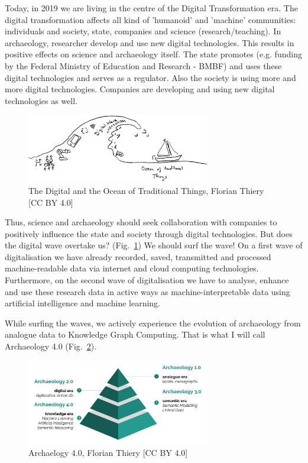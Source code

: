 \documentclass[twocolumn]{autart}
\begin{document}
Today, in 2019 we are living in the centre of the Digital Transformation era. The digital transformation affects all kind of 'humanoid' and 'machine' communities: individuals and society, state, companies and science (research/teaching). In archaeology, researcher develop and use new digital technologies. This results in positive effects on science and archaeology itself. The state promotes (e.g. funding by the Federal Ministry of Education and Research - BMBF) and uses these digital technologies and serves as a regulator. Also the society is using more and more digital technologies. Companies are developing and using new digital technologies as well.

\begin{figure}[!htb]
\begin{center}
\includegraphics[width=8cm]{Digital_Wave_and_the_Ocean_of_Traditional_Things.png}
\caption{The Digital and the Ocean of Traditional Things, Florian Thiery [CC BY 4.0]}
\label{figdigitalwave}
\end{center}
\end{figure}

Thus, science and archaeology should seek collaboration with companies to positively influence the state and society through digital technologies. But does the digital wave overtake us? (Fig.~\ref{figdigitalwave}) We should surf the wave! On a first wave of digitalisation we have already recorded, saved, transmitted and processed machine-readable data via internet and cloud computing technologies. Furthermore, on the second wave of digitalisation we have to analyse, enhance and use these research data in active ways as machine-interpretable data using artificial intelligence and machine learning.

While surfing the waves, we actively experience the evolution of archaeology from analogue data to Knowledge Graph Computing. That is what I will call Archaeology 4.0 (Fig.~\ref{figa40pyramid}).

\begin{figure}[!htb]
\begin{center}
\includegraphics[width=8cm]{Archaeology_40.png}    
\caption{Archaelogy 4.0, Florian Thiery [CC BY 4.0]}  
\label{figa40pyramid}                               
\end{center}                                
\end{figure}
\end{document}
